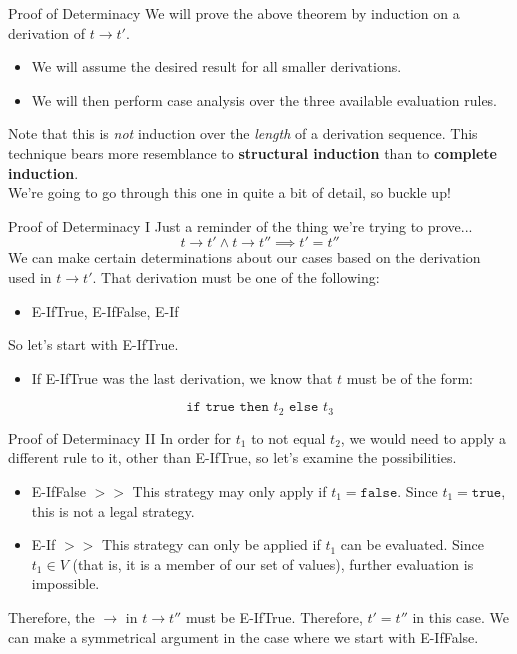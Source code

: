\documentclass[11pt]{beamer}
\begin{document}
\begin{frame}[fragile=singleslide]{Proof of Determinacy}
We will prove the above theorem by induction on a derivation of $t \rightarrow t'$.  
\begin{itemize}
\item We will assume the desired result for all smaller derivations.
\item We will then perform case analysis over the three available evaluation rules.  
\end{itemize}
Note that this is \emph{not} induction over the \emph{length} of a derivation sequence.  This technique bears more resemblance to \textbf{structural induction} than to \textbf{complete induction}.   \\
\vspace{1em}
We're going to go through this one in quite a bit of detail, so buckle up! 
\end{frame}

\begin{frame}[fragile=singleslide]{Proof of Determinacy I}
Just a reminder of the thing we're trying to prove...
\begin{equation}
t \rightarrow t' \land t \rightarrow t'' \implies t' = t''
\end{equation}
We can make certain determinations about our cases based on the derivation used in $t \rightarrow t'$.  That derivation must be one of the following:
\begin{itemize}
\item E-IfTrue, E-IfFalse, E-If
\end{itemize}
So let's start with E-IfTrue.
\begin{itemize}
\item If E-IfTrue was the last derivation, we know that $t$ must be of the form:
\end{itemize}
\begin{equation}
\texttt{if true then } t_2 \texttt{ else } t_3
\end{equation}
\end{frame}

\begin{frame}[fragile=singleslide]{Proof of Determinacy II}
In order for $t_1$ to not equal $t_2$, we would need to apply a different rule to it, other than E-IfTrue, so let's examine the possibilities.
\begin{itemize}
\item E-IfFalse $>>$ This strategy may only apply if $t_1 = \texttt{false}$.  Since $t_1 = \texttt{true}$, this is not a legal strategy.  
\item E-If $>>$ This strategy can only be applied if $t_1$ can be evaluated.  Since $t_1 \in V$ (that is, it is a member of our set of values), further evaluation is impossible.   
\end{itemize}
Therefore, the $\rightarrow$ in $t \rightarrow t''$ must be E-IfTrue.  Therefore, $t' = t''$ in this case.  
\vspace{1em}
We can make a symmetrical argument in the case where we start with E-IfFalse.  
\end{frame}
\end{document}
